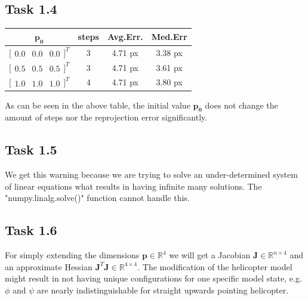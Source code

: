 \documentclass[a4paper]{article} %
\begin{document}
    \subsection*{Task 1.4}
    \begin{center}
        \begin{tabular}{cccc}
            \hline
            $\bm{p_0}$ & steps & Avg.Err. & Med.Err \\
            \hline \hline
            $ \bigl[ \begin{smallmatrix}
                         0.0 & 0.0 & 0.0
            \end{smallmatrix} \bigr] ^T$ &
            3 & 4.71 px & 3.38 px\\
            $ \bigl[ \begin{smallmatrix}
                         0.5 & 0.5 & 0.5
            \end{smallmatrix} \bigr] ^T$ &
            3 & 4.71 px & 3.61 px \\
            $ \bigl[ \begin{smallmatrix}
                         1.0 & 1.0 & 1.0
            \end{smallmatrix} \bigr] ^T$ &
            4 & 4.71 px & 3.80 px\\
        \end{tabular}
    \end{center}
    As can be seen in the above table, the initial value $\bm{p_0}$ does not change the amount of steps nor the reprojection error significantly.

    \subsection*{Task 1.5}
    We get this warning because we are trying to solve an under-determined system of linear equations what results in having infinite many solutions.
    The "numpy.linalg.solve()" function cannot handle this.

    \subsection*{Task 1.6}
    For simply extending the dimensions $\bm{p} \in \mathbb{R}^4$ we will get a Jacobian $ \bm{J} \in \mathbb{R}^{n \times 4}$ and an approximate Hessian $\bm{J}^T \bm{J} \in \mathbb{R}^{4 \times 4} $.
    The modification of the helicopter model might result in not having unique configurations for one specific model state, e.g. $\phi$ and $\psi$ are nearly indistinguishable for straight upwards pointing helicopter.
\end{document}
